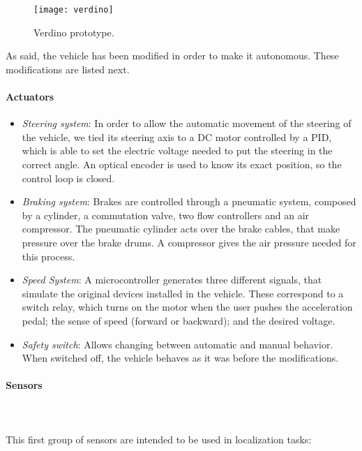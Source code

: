 \begin{figure}[h!]
  \centering
  \texttt{[image: verdino]}
  \caption{Verdino prototype.}\label{fig:cp00_verdino}
\end{figure}


As said, the vehicle has been modified in order to make it autonomous. These modifications are listed next.

\paragraph{Actuators}\label{ch:chapter00_03_00_00_01}
\begin{itemize}
 \item \emph{Steering system}: In order to allow the automatic movement of the steering of the vehicle, we tied its steering axis to a DC motor controlled by a \ac{PID}, which is able to set the electric voltage needed to put the steering in the correct angle. An optical encoder is used to know its exact position, so the control loop is closed.
 \item \emph{Braking system}: Brakes are controlled through a pneumatic system, composed by a cylinder, a commutation valve, two flow controllers and an air compressor. The pneumatic cylinder acts over the brake cables, that make pressure over the brake drums. A compressor gives the air pressure needed for this process.
 \item \emph{Speed System}: A microcontroller generates three different signals, that simulate the original devices installed in the vehicle. These correspond to a switch relay, which turns on the motor when the user pushes the acceleration pedal; the sense of speed (forward or backward); and the desired voltage.
 \item \emph{Safety switch}: Allows changing between automatic and manual behavior. When switched off, the vehicle behaves as it was before the modifications.
\end{itemize}

\paragraph{Sensors}\label{ch:chapter00_03_00_00_02}

~\\~\\This first group of sensors are intended to be used in localization tasks:

